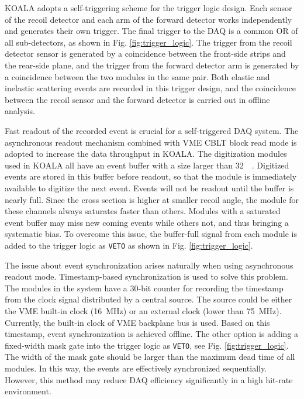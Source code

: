 \documentclass[number,5p]{elsarticle}
\begin{document}
KOALA adopts a self-triggering scheme for the trigger logic design.
Each sensor of the recoil detector and each arm of the forward detector works independently and generates their own trigger. 
The final trigger to the DAQ is a common OR of all sub-detectors, as shown in Fig. \ref{fig:trigger_logic}.
The trigger from the recoil detector sensor is generated by a coincidence between the front-side strips and the rear-side plane, 
and the trigger from the forward detector arm is generated by a coincidence between the two modules in the same pair.
Both elastic and inelastic scattering events are recorded in this trigger design, and the coincidence between the recoil sensor and the forward detector is carried out in offline analysis.

Fast readout of the recorded event is crucial for a self-triggered DAQ system.
The asynchronous readout mechanism combined with VME CBLT block read mode is adopted to increase the data throughput in KOALA.
The digitization modules used in KOALA all have an event buffer with a size
larger than \SI{32}{\kilo\byte}.
Digitized events are stored in this buffer before readout, so that the module is immediately available to digitize the next event.
Events will not be readout until the buffer is nearly full.
Since the cross section is higher at smaller recoil angle, the module for these channels always saturates faster than others.
Modules with a saturated event buffer may miss new coming events while others
not, and thus bringing a systematic bias.
To overcome this issue, the buffer-full signal from each module is added to the trigger logic as \texttt{VETO} as shown in Fig. \ref{fig:trigger_logic}.

The issue about event synchronization arises naturally when using asynchronous
readout mode.
Timestamp-based synchronization is used to solve this problem.
The modules in the system have a 30-bit counter for recording the timestamp from
the clock signal distributed by a central source.
The source could be either the VME built-in clock (\SI{16}{\MHz}) or an external clock
(lower than \SI{75}{\MHz}).
Currently, the built-in clock of VME backplane bus is used. 
Based on this timestamp, event synchronization is achieved offline.
The other option is adding a fixed-width mask gate into the trigger logic as \texttt{VETO}, see Fig. \ref{fig:trigger_logic}.
The width of the mask gate should be larger than the maximum dead time of all modules.
In this way, the events are effectively synchronized sequentially. 
However, this method may reduce DAQ efficiency significantly in a high hit-rate environment.
\end{document}
